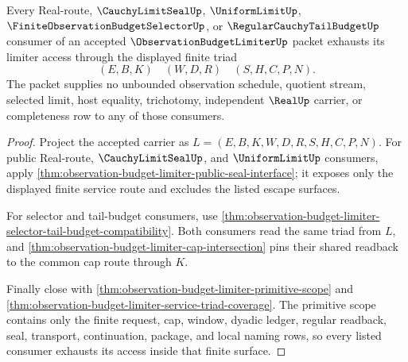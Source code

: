 \begin{theorem}
\label{thm:observation-budget-limiter-real-route-budget-exhaustion}
Every Real-route, $\CauchyLimitSealUp$, $\UniformLimitUp$, $\FiniteObservationBudgetSelectorUp$, or $\RegularCauchyTailBudgetUp$ consumer of an accepted $\ObservationBudgetLimiterUp$ packet exhausts its limiter access through the displayed finite triad
$$
(E,B,K) \quad (W,D,R) \quad (S,H,C,P,N).
$$
The packet supplies no unbounded observation schedule, quotient stream, selected limit, host equality, trichotomy, independent $\RealUp$ carrier, or completeness row to any of those consumers.
\end{theorem}
\begin{proof}
Project the accepted carrier as $L=(E,B,K,W,D,R,S,H,C,P,N)$. For public Real-route, $\CauchyLimitSealUp$, and $\UniformLimitUp$ consumers, apply \autoref{thm:observation-budget-limiter-public-seal-interface}; it exposes only the displayed finite service route and excludes the listed escape surfaces.

For selector and tail-budget consumers, use \autoref{thm:observation-budget-limiter-selector-tail-budget-compatibility}. Both consumers read the same triad from $L$, and \autoref{thm:observation-budget-limiter-cap-intersection} pins their shared readback to the common cap route through $K$.

Finally close with \autoref{thm:observation-budget-limiter-primitive-scope} and \autoref{thm:observation-budget-limiter-service-triad-coverage}. The primitive scope contains only the finite request, cap, window, dyadic ledger, regular readback, seal, transport, continuation, package, and local naming rows, so every listed consumer exhausts its access inside that finite surface.
\end{proof}


